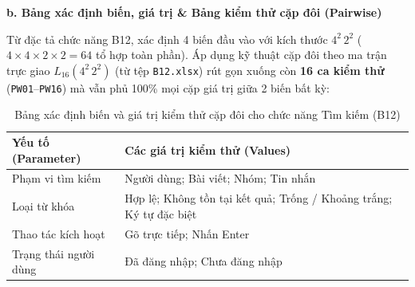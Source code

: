 \documentclass[11pt,a4paper]{article}
\begin{document}
\noindent\textbf{b. Bảng xác định biến, giá trị \& Bảng kiểm thử cặp đôi (Pairwise)}

Từ đặc tả chức năng B12, xác định 4 biến đầu vào với kích thước $4^2\,2^2$ ($4 \times 4 \times 2 \times 2 = 64$ tổ hợp toàn phần). Áp dụng kỹ thuật cặp đôi theo ma trận trực giao $L_{16}(4^2\,2^2)$ (từ tệp \texttt{B12.xlsx}) rút gọn xuống còn \textbf{16 ca kiểm thử} (\texttt{PW01}--\texttt{PW16}) mà vẫn phủ 100\% mọi cặp giá trị giữa 2 biến bất kỳ:

\begin{table}[H]
\centering
\small
\begin{tabularx}{\textwidth}{|L{4.5cm}|X|}
\hline
{}
\textbf{Yếu tố (Parameter)} & \textbf{Các giá trị kiểm thử (Values)} \tabularnewline
\hline
Phạm vi tìm kiếm & Người dùng; Bài viết; Nhóm; Tin nhắn \\ \hline
Loại từ khóa & Hợp lệ; Không tồn tại kết quả; Trống / Khoảng trắng; Ký tự đặc biệt \\ \hline
Thao tác kích hoạt & Gõ trực tiếp; Nhấn Enter \\ \hline
Trạng thái người dùng & Đã đăng nhập; Chưa đăng nhập \\ \hline
\end{tabularx}
\caption{Bảng xác định biến và giá trị kiểm thử cặp đôi cho chức năng Tìm kiếm (B12)}
\end{table}
\end{document}

